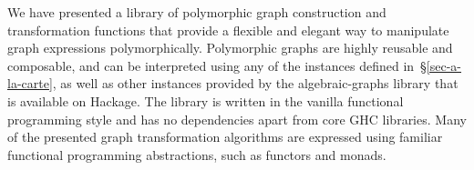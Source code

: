 We have presented a library of polymorphic graph construction and
transformation functions that provide a flexible and elegant way to manipulate
graph expressions polymorphically. Polymorphic graphs are highly reusable
and composable, and can be interpreted using any of the  instances
defined in~\S\ref{sec-a-la-carte}, as well as other instances provided by the
\textsf{algebraic-graphs} library that is available on Hackage.
The library is written in the vanilla functional programming style and has
no dependencies apart from core GHC libraries.
Many of the presented graph transformation algorithms are expressed using familiar
functional programming abstractions, such as functors and monads.
